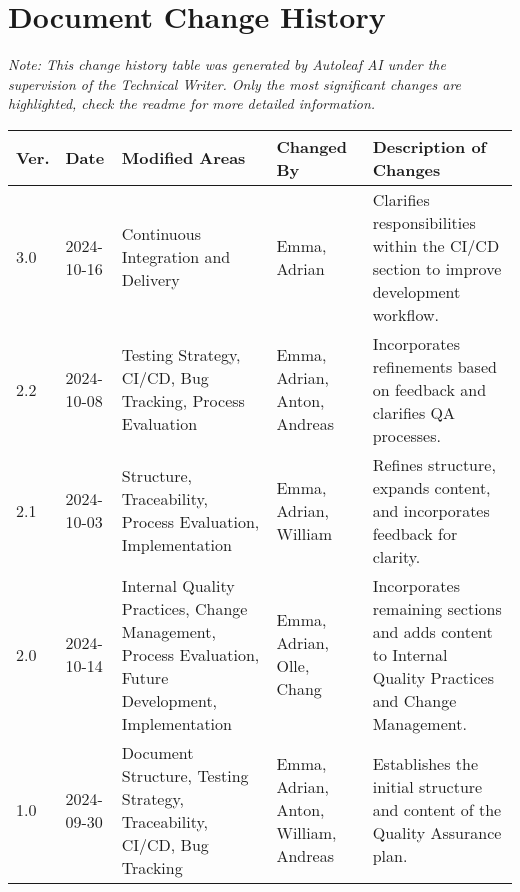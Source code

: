 \section{Document Change History}

\begin{center}
\small\textit{Note: This change history table was generated by Autoleaf AI under the supervision of the Technical Writer. Only the most significant changes are highlighted, check the readme for more detailed information.}

\vspace{0.5cm}

\begin{tabular}{|p{}|p{}|p{}|p{}|p{}|}
\hline
\textbf{Ver.} & \textbf{Date} & \textbf{Modified Areas} & \textbf{Changed By} & \textbf{Description of Changes} \\
\hline
3.0 & 2024-10-16 & Continuous Integration and Delivery & Emma, Adrian & Clarifies responsibilities within the CI/CD section to improve development workflow. \\
\hline
2.2 & 2024-10-08 & Testing Strategy, CI/CD, Bug Tracking, Process Evaluation & Emma, Adrian, Anton, Andreas & Incorporates refinements based on feedback and clarifies QA processes. \\
\hline
2.1 & 2024-10-03 & Structure, Traceability, Process Evaluation, Implementation & Emma, Adrian, William & Refines structure, expands content, and incorporates feedback for clarity. \\
\hline
2.0 & 2024-10-14 & Internal Quality Practices, Change Management, Process Evaluation, Future Development, Implementation & Emma, Adrian, Olle, Chang & Incorporates remaining sections and adds content to Internal Quality Practices and Change Management. \\
\hline
1.0 & 2024-09-30 & Document Structure, Testing Strategy, Traceability, CI/CD, Bug Tracking & Emma, Adrian, Anton, William, Andreas & Establishes the initial structure and content of the Quality Assurance plan. \\
\hline
\end{tabular}
\end{center}

\vspace{1cm} 
